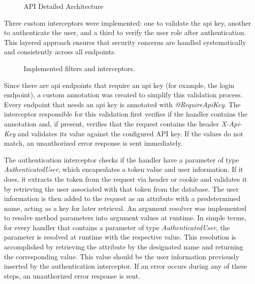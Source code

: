 \begin{figure}[H]
    \centering
    
    \caption{API Detailed Architecture}
    \label{fig:detailed_api_architecture}
\end{figure}

Three custom interceptors were implemented: one to validate the \acs{api} key, another to authenticate the user, and a third to verify the user role after authentication. This layered approach ensures that security concerns are handled systematically and consistently across all endpoints.

\begin{figure}[H]
    \centering
    
    \caption{Implemented filters and interceptors.}
    \label{fig:filters_vs_interceptors}
\end{figure}

Since there are \acs{api} endpoints that require an \acs{api} key (for example, the login endpoint), a custom annotation was created to simplify this validation process. Every endpoint that needs an \acs{api} key is annotated with \textit{@RequireApiKey}. The interceptor responsible for this validation first verifies if the handler contains the annotation and, if present, verifies that the request contains the header \textit{X-Api-Key} and validates its value against the configured API key. If the values do not match, an unauthorized error response is sent immediately.

The authentication interceptor checks if the handler have a parameter of type \textit{AuthenticatedUser}, which encapsulates a token value and user information. If it does, it extracts the token from the request via header or cookie and validates it by retrieving the user associated with that token from the database. The user information is then added to the request as an attribute with a predetermined name, acting as a key for later retrieval. An argument resolver was implemented to resolve method parameters into argument values at runtime. In simple terms, for every handler that contains a parameter of type \textit{AuthenticatedUser}, the parameter is resolved at runtime with the respective value. This resolution is accomplished by retrieving the attribute by the designated name and returning the corresponding value. This value should be the user information previously inserted by the authentication interceptor. If an error occurs during any of these steps, an unauthorized error response is sent.

